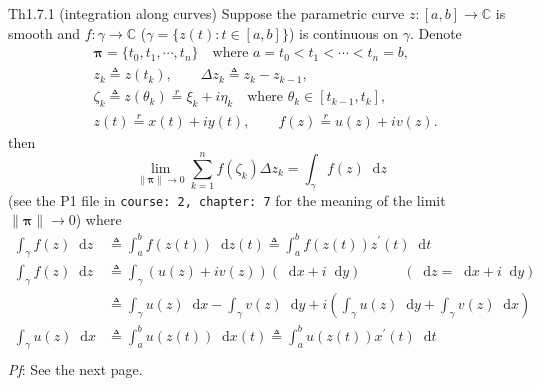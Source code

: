 \documentclass{article}
\newcommand{\dif}{\mathop{}\!\mathrm{d}}
\begin{document}
\begin{Th}{Th1.7.1 (integration along curves)}
    Suppose the parametric curve $z: [a,b]\to\mathbb{C}$ is smooth and $f:\gamma\to\mathbb{C}$ ($\gamma = \{z(t): t\in [a,b]\}$) is continuous on $\gamma$. Denote
    $$
    \begin{aligned}
        & \pmb{\pi} = \{t_0, t_1, \cdots, t_n\} \quad\text{where } a = t_0 < t_1 < \cdots < t_n = b, \\
        & z_k \triangleq z(t_k), \qquad \Delta z_k \triangleq z_k - z_{k-1}, \\
        & \zeta_k \triangleq z(\theta_k) \overset{r}{=} \xi_k + i\eta_k \quad\text{where } \theta_k\in [t_{k-1}, t_k], \\
        & z(t) \overset{r}{=} x(t) + iy(t), \qquad f(z) \overset{r}{=} u(z) + iv(z).
    \end{aligned}
    $$
    then
    $$ \lim\limits_{\|\pmb{\pi}\|\to 0} \sum_{k=1}^{n} f(\zeta_k)\Delta z_k = \int_\gamma f(z)\dif z $$
    (see the P1 file in \verb|course: 2, chapter: 7| for the meaning of the limit $\|\pmb{\pi}\|\to 0$) where \textcolor{Df}{
    $$ 
    \begin{aligned}
        \int_\gamma f(z)\dif z & \triangleq \int_a^b f(z(t))\dif z(t) \triangleq \int_{a}^{b} f(z(t))z^\prime (t) \dif t \\
        \int_\gamma f(z)\dif z & \triangleq \int_\gamma \left(u(z) + iv(z)\right)\left(\dif x + i\dif y\right) \quad\qquad (\dif z = \dif x + i\dif y) \\
        & \triangleq \int_\gamma u(z)\dif x - \int_\gamma v(z)\dif y + i\left(\int_\gamma u(z)\dif y + \int_\gamma v(z)\dif x\right) \\
        \int_\gamma u(z)\dif x & \triangleq \int_a^b u(z(t))\dif x(t) \triangleq \int_a^b u(z(t))x^\prime (t)\dif t \\
    \end{aligned}
    $$}
    \tcblower
    \textit{Pf}: See the next page.
\end{Th}
\end{document}
